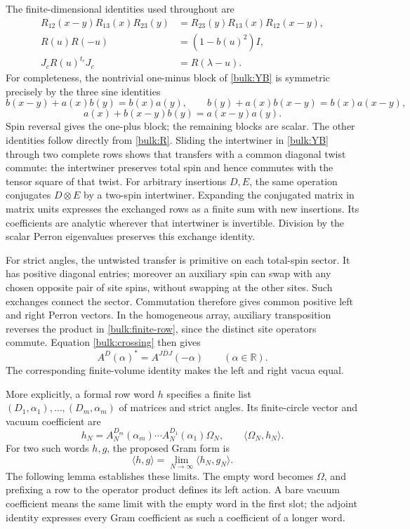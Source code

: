 The finite-dimensional identities used throughout are
\begin{align}
 R_{12}(x-y)R_{13}(x)R_{23}(y)
 &=R_{23}(y)R_{13}(x)R_{12}(x-y),\label{bulk:YB}\\
 R(u)R(-u)&=(1-b(u)^2)I,\label{bulk:inversion}\\
 J_cR(u)^{t_c}J_c&=R(\lambda-u).\label{bulk:crossing}
\end{align}
For completeness, the nontrivial one-minus block of
\eqref{bulk:YB} is symmetric precisely by the three sine identities
\[
 b(x-y)+a(x)b(y)=b(x)a(y),\qquad
 b(y)+a(x)b(x-y)=b(x)a(x-y),
\]
\[
 a(x)+b(x-y)b(y)=a(x-y)a(y).
\]
Spin reversal gives the one-plus block; the remaining blocks are
scalar. The other identities follow directly from \eqref{bulk:R}.
Sliding the intertwiner in \eqref{bulk:YB} through two complete rows
shows that transfers with a common diagonal twist commute: the
intertwiner preserves total spin and hence commutes with the tensor
square of that twist. For arbitrary insertions $D,E$, the same
operation conjugates $D\otimes E$ by a two-spin intertwiner.
Expanding the conjugated matrix in matrix units expresses the
exchanged rows as a finite sum with new insertions. Its coefficients
are analytic wherever that intertwiner is invertible. Division by
the scalar Perron eigenvalues preserves this exchange identity.

For strict angles, the untwisted transfer is primitive on each
total-spin sector. It has positive diagonal entries; moreover an
auxiliary spin can swap with any chosen opposite pair of site
spins, without swapping at the other sites. Such exchanges connect
the sector. Commutation therefore gives common positive left and
right Perron vectors. In the homogeneous array, auxiliary
transposition reverses the product in \eqref{bulk:finite-row}, since
the distinct site operators commute. Equation \eqref{bulk:crossing}
then gives
\begin{equation}\label{bulk:adjoint}
 A^D(\alpha)^*=A^{J\overline D J}(-\alpha)
 \qquad(\alpha\in\mathbb R).
\end{equation}
The corresponding finite-volume identity makes the left and right
vacua equal.

More explicitly, a formal row word $h$ specifies a finite list
$(D_1,\alpha_1),\ldots,(D_m,\alpha_m)$ of matrices and strict angles.
Its finite-circle vector and vacuum coefficient are
\[
 h_N=A_N^{D_m}(\alpha_m)\cdots A_N^{D_1}(\alpha_1)\Omega_N,
 \qquad \langle\Omega_N,h_N\rangle.
\]
For two such words $h,g$, the proposed Gram form is
\[
 \langle h,g\rangle=\lim_{N\to\infty}\langle h_N,g_N\rangle.
\]
The following lemma establishes these limits. The empty word becomes
$\Omega$, and prefixing a row to the operator product defines its left
action. A bare vacuum coefficient means the same limit with the empty
word in the first slot; the adjoint identity expresses every Gram
coefficient as such a coefficient of a longer word.

